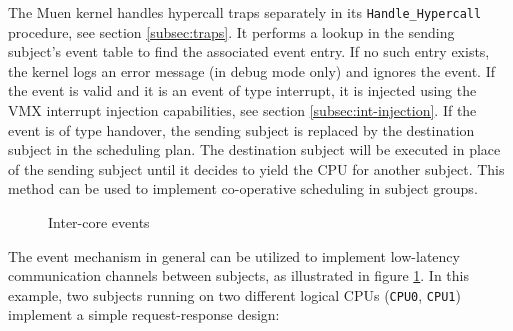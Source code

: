 The Muen kernel handles hypercall traps separately in its
\texttt{Handle\_Hypercall} procedure, see section \ref{subsec:traps}. It
performs a lookup in the sending subject's event table to find the associated
event entry. If no such entry exists, the kernel logs an error message (in
debug mode only) and ignores the event. If the event is valid and it is an
event of type interrupt, it is injected using the VMX interrupt injection
capabilities, see section \ref{subsec:int-injection}. If the event is of type
handover, the sending subject is replaced by the destination subject in the
scheduling plan.  The destination subject will be executed in place of the
sending subject until it decides to yield the CPU for another subject. This
method can be used to implement co-operative scheduling in subject groups.

\begin{figure}[h]
	\centering
	
	\caption{Inter-core events}
	\label{fig:inter-core-events}
\end{figure}

The event mechanism in general can be utilized to implement low-latency
communication channels between subjects, as illustrated in figure
\ref{fig:inter-core-events}. In this example, two subjects running on two
different logical CPUs (\texttt{CPU0}, \texttt{CPU1}) implement a simple
request-response design:

